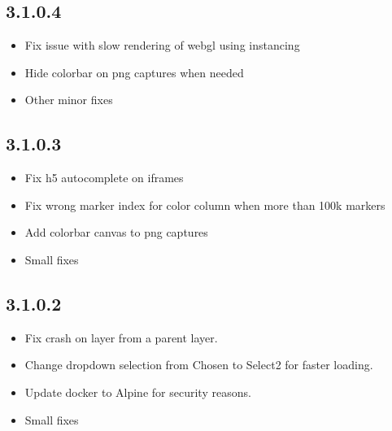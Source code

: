\documentclass[letterpaper,10pt,english,openany,oneside]{sphinxmanual}
\begin{document}
\subsection{3.1.0.4}
\label{\detokenize{docs/intro/versions:id20}}\begin{itemize}
\item {} 
\sphinxAtStartPar
Fix issue with slow rendering of web\sphinxhyphen{}gl using instancing

\item {} 
\sphinxAtStartPar
Hide colorbar on png captures when needed

\item {} 
\sphinxAtStartPar
Other minor fixes

\end{itemize}


\subsection{3.1.0.3}
\label{\detokenize{docs/intro/versions:id21}}\begin{itemize}
\item {} 
\sphinxAtStartPar
Fix h5 autocomplete on iframes

\item {} 
\sphinxAtStartPar
Fix wrong marker index for color column when more than 100k markers

\item {} 
\sphinxAtStartPar
Add colorbar canvas to png captures

\item {} 
\sphinxAtStartPar
Small fixes

\end{itemize}


\subsection{3.1.0.2}
\label{\detokenize{docs/intro/versions:id22}}\begin{itemize}
\item {} 
\sphinxAtStartPar
Fix crash on layer from a parent layer.

\item {} 
\sphinxAtStartPar
Change dropdown selection from Chosen to Select2 for faster loading.

\item {} 
\sphinxAtStartPar
Update docker to Alpine for security reasons.

\item {} 
\sphinxAtStartPar
Small fixes

\end{itemize}
\end{document}
